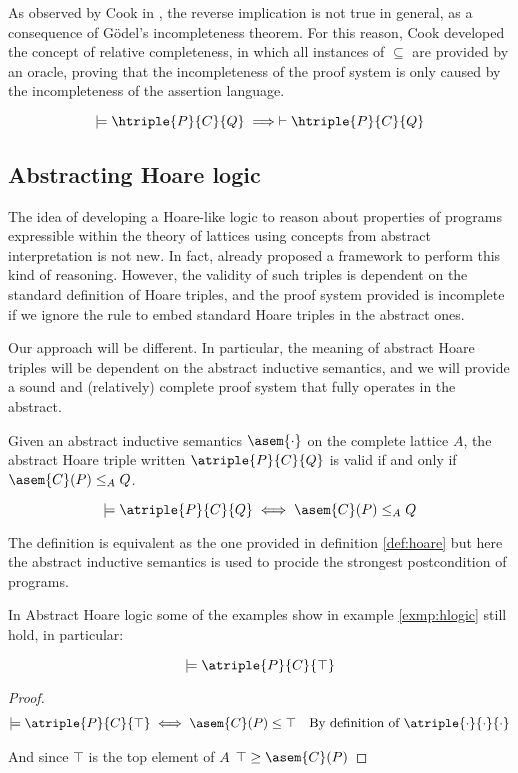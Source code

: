 As observed by Cook in \cite{Cook78}, the reverse implication is not true in 
general, as a consequence of Gödel's incompleteness theorem. For this reason, 
Cook developed the concept of relative completeness, in which all instances of 
$\subseteq$ are provided by an oracle, proving that the incompleteness of the 
proof system is only caused by the incompleteness of the assertion language.

\begin{theorem}
  \label{thm:hlogic-complete}
  $$\models \htriple{P}{C}{Q} \implies \vdash \htriple{P}{C}{Q}$$
\end{theorem}

\subsection{Abstracting Hoare logic}
The idea of developing a Hoare-like logic to reason about properties of 
programs expressible within the theory of lattices using concepts from abstract 
interpretation is not new. In fact, \cite{Cousot12} already proposed a framework 
to perform this kind of reasoning. However, the validity of such triples is 
dependent on the standard definition of Hoare triples, and the proof system 
provided is incomplete if we ignore the rule to embed standard Hoare triples 
in the abstract ones.

Our approach will be different. In particular, the meaning of abstract Hoare 
triples will be dependent on the abstract inductive semantics, and we will 
provide a sound and (relatively) complete proof system that fully operates in 
the abstract.

\begin{definition}
  \label{def:aht}
  Given an abstract inductive semantics $\asem{\cdot}$ on the complete lattice
  $A$, the abstract Hoare triple written $\atriple{P}{C}{Q}$ is valid if
  and only if $\asem{C}(P) \leq_A Q$.

  $$\models \atriple{P}{C}{Q} \iff \asem{C}(P) \leq_A Q$$
\end{definition}

The definition is equivalent as the one provided in definition \ref{def:hoare} 
but here the abstract inductive semantics is used to procide the strongest 
postcondition of programs.

In Abstract Hoare logic some of the examples show in example \ref{exmp:hlogic} still 
hold, in particular:
\begin{theorem}
  $$\models \atriple{P}{C}{\top}$$
\end{theorem}
\begin{proof}
  \begin{align*}
    \models \atriple{P}{C}{\top}
      & \iff \asem{C}(P) \leq \top & \text{By definition of $\atriple{\cdot}{\cdot}{\cdot}$} \\
  \end{align*}

  And since $\top$ is the top element of $A$ $\top \geq \asem{C}(P)$
\end{proof}

